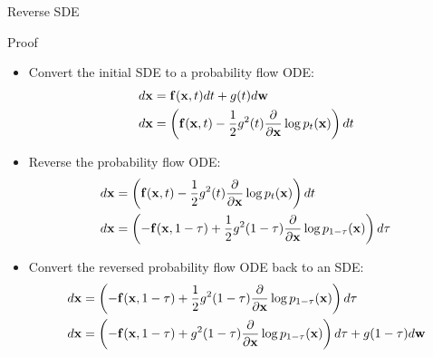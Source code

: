 \documentclass{beamer}
\begin{document}
\begin{frame}{Reverse SDE}
	\begin{block}{Proof}
		\begin{itemize}
			\item Convert the initial SDE to a probability flow ODE:
			\vspace{-0.1cm}
			{\footnotesize
			\begin{align*}
				d\mathbf{x} &= \mathbf{f}(\mathbf{x}, t) dt + g(t) d \mathbf{w} \\
				d\mathbf{x} &= \left(\mathbf{f}(\mathbf{x}, t) -\frac{1}{2} g^2(t) \frac{\partial}{\partial \mathbf{x}} \log p_t(\mathbf{x}) \right) dt
			\end{align*}
			}
			\vspace{-0.5cm}
			\eqpause
			\item Reverse the probability flow ODE:
			\vspace{-0.1cm}
			{\footnotesize
			\begin{align*}
				d\mathbf{x} &= \left(\mathbf{f}(\mathbf{x}, t) -\frac{1}{2} g^2(t) \frac{\partial}{\partial \mathbf{x}} \log p_t(\mathbf{x}) \right) dt \\
				d\mathbf{x} &= \left(-\mathbf{f}(\mathbf{x}, 1 - \tau) + \frac{1}{2} g^2(1 - \tau) \frac{\partial}{\partial \mathbf{x}} \log p_{1 - \tau}(\mathbf{x}) \right) d\tau
			\end{align*}
			}
			\vspace{-0.5cm}
			\eqpause
			\item Convert the reversed probability flow ODE back to an SDE:
			\vspace{-0.1cm}
			{\footnotesize
			\begin{align*}
				d\mathbf{x} &= \left(-\mathbf{f}(\mathbf{x}, 1 - \tau) + \frac{1}{2} g^2(1 - \tau) \frac{\partial}{\partial \mathbf{x}} \log p_{1 - \tau}(\mathbf{x}) \right) d \tau \\
				d\mathbf{x} &= \left(-\mathbf{f}(\mathbf{x}, 1 - \tau) + g^2(1 - \tau) \frac{\partial}{\partial \mathbf{x}} \log p_{1 - \tau}(\mathbf{x}) \right) d \tau + g(1-\tau)d\mathbf{w}
			\end{align*}
			}
		\end{itemize}
	\end{block}
\end{frame}
\end{document}
